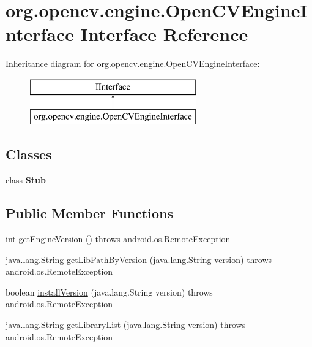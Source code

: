\hypertarget{interfaceorg_1_1opencv_1_1engine_1_1_open_c_v_engine_interface}{}\section{org.\+opencv.\+engine.\+Open\+C\+V\+Engine\+Interface Interface Reference}
\label{interfaceorg_1_1opencv_1_1engine_1_1_open_c_v_engine_interface}
Inheritance diagram for org.\+opencv.\+engine.\+Open\+C\+V\+Engine\+Interface\+:\begin{figure}[H]
\begin{center}
\leavevmode
\includegraphics[height=2.000000cm]{interfaceorg_1_1opencv_1_1engine_1_1_open_c_v_engine_interface}
\end{center}
\end{figure}
\subsection*{Classes}
\begin{DoxyCompactItemize}
\item 
class {\bfseries Stub}
\end{DoxyCompactItemize}
\subsection*{Public Member Functions}
\begin{DoxyCompactItemize}
\item 
int \mbox{\hyperlink{interfaceorg_1_1opencv_1_1engine_1_1_open_c_v_engine_interface_ad6faeb57f72ca9821c80cdfab7fe05f9}{get\+Engine\+Version}} ()  throws android.\+os.\+Remote\+Exception
\item 
java.\+lang.\+String \mbox{\hyperlink{interfaceorg_1_1opencv_1_1engine_1_1_open_c_v_engine_interface_a70de2408a41737727317a79292063955}{get\+Lib\+Path\+By\+Version}} (java.\+lang.\+String version)  throws android.\+os.\+Remote\+Exception
\item 
boolean \mbox{\hyperlink{interfaceorg_1_1opencv_1_1engine_1_1_open_c_v_engine_interface_a732afa1d3a88ad6dc6019be41c2383f3}{install\+Version}} (java.\+lang.\+String version)  throws android.\+os.\+Remote\+Exception
\item 
java.\+lang.\+String \mbox{\hyperlink{interfaceorg_1_1opencv_1_1engine_1_1_open_c_v_engine_interface_ab98adfcf7de2add59b6b0f5308079b9b}{get\+Library\+List}} (java.\+lang.\+String version)  throws android.\+os.\+Remote\+Exception
\end{DoxyCompactItemize}



